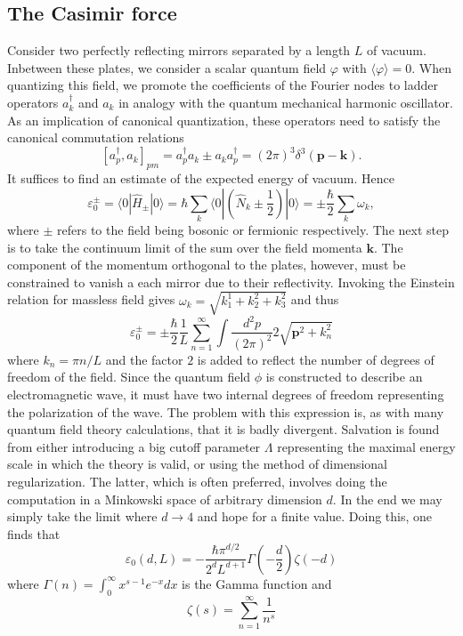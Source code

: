 \documentclass[twoside,utf8]{article}
\newcommand{\ket}[1] { |#1\rangle }
\newcommand{\expe}[1]{ \langle #1 \rangle }
\newcommand{\bra}[1] { \langle #1 | }
\begin{document}
\subsection{The Casimir force}
Consider two perfectly reflecting mirrors separated by a length $L$ of vacuum. Inbetween these plates, we consider a scalar quantum field $\varphi$ with $\expe{\varphi}=0$. When quantizing this field, we promote the coefficients of the Fourier nodes to ladder operators $a^\dagger_k$ and $a_k$ in analogy with the quantum mechanical harmonic oscillator. As an implication of canonical quantization, these operators need to satisfy the canonical commutation relations
\[
\left[a^\dagger_p,a_k\right]_{pm}
=a^\dagger_p a_k \pm a_k a^\dagger_p
= (2\pi)^3\delta^{3}(\mathbf{p}-\mathbf{k}).
\]
It suffices to find an estimate of the expected energy of vacuum. Hence
\[
\varepsilon_0^\pm = \bra{0}\hat{H}_\pm\ket{0} = \hbar \sum_k \bra{0} \left(\hat{N}_k\pm \frac{1}{2}\right)\ket{0} = \pm \frac{\hbar}{2}\sum_k \omega_k,
\]
where $\pm$ refers to the field being bosonic or fermionic respectively. The next step is to take the continuum limit of the sum over the field momenta $\mathbf{k}$. The component of the momentum orthogonal to the plates, however, must be constrained to vanish a each mirror due to their reflectivity. Invoking the Einstein relation for massless field gives $\omega_k = \sqrt{k_1^1+k_2^2+k_3^2}$ and thus
\[
\varepsilon_0^\pm = \pm \frac{\hbar}{2}\frac{1}{L}\sum_{n=1}^\infty \int \frac{d^2p}{(2\pi)^2} 2 \sqrt{\mathbf{p}^2+k_n^2}
\]
where $k_n=\pi n/L$ and the factor $2$ is added to reflect the number of degrees of freedom of the field. Since the quantum field $\phi$ is constructed to describe an electromagnetic wave, it must have two internal degrees of freedom representing the polarization of the wave.
The problem with this expression is, as with many quantum field theory calculations, that it is badly divergent. Salvation is found from either introducing a big cutoff parameter $\Lambda$ representing the maximal energy scale in which the theory is valid, or using the method of dimensional regularization. The latter, which is often preferred, involves doing the computation in a Minkowski space of arbitrary dimension $d$. In the end we may simply take the limit where $d\rightarrow 4$ and hope for a finite value. Doing this, one finds that
\[
\varepsilon_0 (d,L) = -\frac{\hbar \pi^{d/2}}{2^d L^{d+1}}\Gamma\left(-\frac{d}{2}\right)\zeta(-d)
\]
where $\Gamma(n)=\int_0^\infty x^{s-1}e^{-x}dx$ is the Gamma function and
\begin{equation}
\zeta(s) = \sum_{n=1}^\infty \frac{1}{n^s} \label{eq:zeta}
\end{equation}
\end{document}
